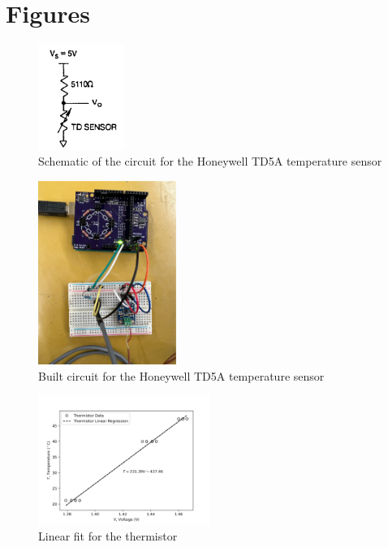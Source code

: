 \section{Figures}
\label{sec:figures}
\begin{figure}[h]
    \centering
    \includegraphics[width=0.25\textwidth]{Appendix/TD5A_circuit.png}
    \caption{Schematic of the circuit for the Honeywell TD5A temperature sensor}
    \label{fig:TD5A_circuit}
\end{figure}

\begin{figure}[h]
    \centering
    \includegraphics[width=0.4\textwidth]{Appendix/lab_manual_circuit.png}
    \caption{Built circuit for the Honeywell TD5A temperature sensor}
    \label{fig:lab_manual_circuit}
\end{figure}

\begin{figure}[h]
    \centering
    \includegraphics[width=0.5\textwidth]{matplotlib/thermistor.png}
    \caption{Linear fit for the thermistor}
    \label{fig:thermistor_calibration}
\end{figure}

